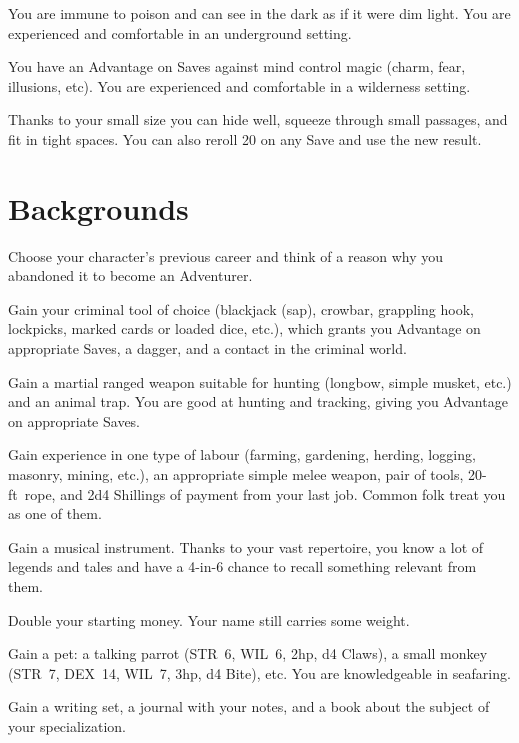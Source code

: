 \documentclass[itdr/core]{subfiles}
\begin{document}
\vfill
{}
You are immune to poison and can see in the dark as if it were dim light. You are experienced and comfortable in an underground setting.

\vfill
{}
You have an Advantage on Saves against mind control magic (charm, fear, illusions, etc). You are experienced and comfortable in a wilderness setting.\tight

\vfill
{}
Thanks to your small size you can hide well, squeeze through small passages, and fit in tight spaces. You can also reroll 20 on any Save and use the new result.

\break

\section{Backgrounds}

Choose your character's previous career and think of a reason why you abandoned it to become an \mbox{Adventurer}.

\vfill
{}
Gain your criminal tool of choice (blackjack (sap), crowbar, grappling hook, lockpicks, marked cards or loaded dice, etc.), which grants you Advantage on appropriate Saves, a dagger, and a contact in the criminal world.

\vfill
{}
Gain a martial ranged weapon suitable for hunting (longbow, simple musket, etc.) and an animal trap. You are good at hunting and tracking, giving you Advantage on appropriate Saves.

\vfill
{}
Gain experience in one type of labour (farming, gardening, herding, logging, masonry, mining, etc.), an appropriate simple melee weapon, pair of tools, \mbox{20-ft rope}, and 2d4 Shillings of payment from your last job. \mbox{Common} folk treat you as one of them.

\vfill
{}
Gain a musical instrument. Thanks to your vast repertoire, you know a lot of legends and tales and have a 4-in-6 chance to recall something relevant from them.

\vfill
{}
Double your starting money. Your name still carries some weight.

\vfill
{}
Gain a pet: a talking parrot (STR~6, WIL~6, 2hp, d4 Claws), a small monkey (STR~7, DEX~14, WIL~7, 3hp, d4 Bite), etc. You are knowledgeable in seafaring.

\vfill
{}
Gain a writing set, a journal with your notes, and a book about the subject of your specialization.
\end{document}
